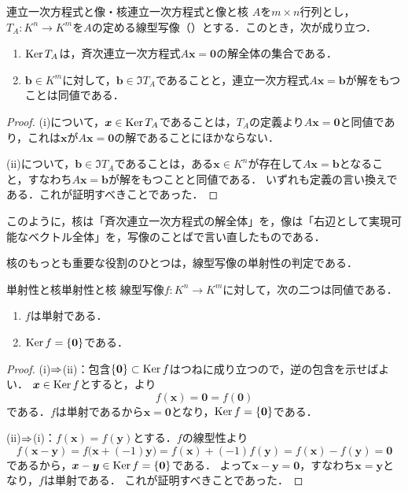 \begin{prop}{連立一次方程式と像・核}{連立一次方程式と像と核}
  $A$を$m \times n$行列とし，$T_A \colon K^n \to K^m$を$A$の定める線型写像（）とする．このとき，次が成り立つ．
  \begin{enumerate}[label=(\roman*),leftmargin=3.2em]
    \item $\operatorname{Ker} T_A$は，斉次連立一次方程式$A\bm{x} = \bm{0}$の解全体の集合である．
    \item $\bm{b} \in K^m$に対して，$\bm{b} \in \Im T_A$であることと，連立一次方程式$A\bm{x} = \bm{b}$が解をもつことは同値である．
  \end{enumerate}
\end{prop}

\begin{tleftbar}
\begin{proof}
  (i)について，$\bm{x} \in \operatorname{Ker} T_A$であることは，$T_A$の定義より$A\bm{x} = \bm{0}$と同値であり，これは$\bm{x}$が$A\bm{x} = \bm{0}$の解であることにほかならない．

  (ii)について，$\bm{b} \in \Im T_A$であることは，ある$\bm{x} \in K^n$が存在して$A\bm{x} = \bm{b}$となること，すなわち$A\bm{x} = \bm{b}$が解をもつことと同値である．
  いずれも定義の言い換えである．これが証明すべきことであった．
\end{proof}
\end{tleftbar}

このように，核は「斉次連立一次方程式の解全体」を，像は「右辺として実現可能なベクトル全体」を，写像のことばで言い直したものである．

核のもっとも重要な役割のひとつは，線型写像の単射性の判定である．

\begin{prop}{単射性と核}{単射性と核}
  線型写像$f \colon K^n \to K^m$に対して，次の二つは同値である．
  \begin{enumerate}[label=(\roman*),leftmargin=3.2em]
    \item $f$は単射である．
    \item $\operatorname{Ker} f = \{\bm{0}\}$である．
  \end{enumerate}
\end{prop}

\begin{tleftbar}
\begin{proof}
  (i)$\mathrel{\Rightarrow}$(ii)：包含$\{\bm{0}\} \subset \operatorname{Ker} f$はつねに成り立つので，逆の包含を示せばよい．
  $\bm{x} \in \operatorname{Ker} f$とすると，より
  \[
    f(\bm{x}) = \bm{0} = f(\bm{0})
  \]
  である．$f$は単射であるから$\bm{x} = \bm{0}$となり，$\operatorname{Ker} f = \{\bm{0}\}$である．

  (ii)$\mathrel{\Rightarrow}$(i)：$f(\bm{x}) = f(\bm{y})$とする．$f$の線型性より
  \[
    f(\bm{x} - \bm{y}) = f\bigl(\bm{x} + (-1)\bm{y}\bigr) = f(\bm{x}) + (-1)f(\bm{y}) = f(\bm{x}) - f(\bm{y}) = \bm{0}
  \]
  であるから，$\bm{x} - \bm{y} \in \operatorname{Ker} f = \{\bm{0}\}$である．
  よって$\bm{x} - \bm{y} = \bm{0}$，すなわち$\bm{x} = \bm{y}$となり，$f$は単射である．
  これが証明すべきことであった．
\end{proof}
\end{tleftbar}

